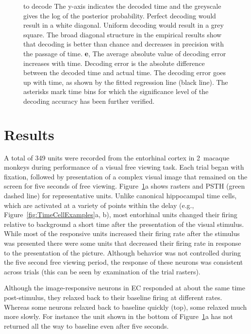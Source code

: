 \documentclass{apa}
\begin{document}
\begin{figure}
{			to decode  The y-axis indicates the decoded time and the greyscale
			gives the log of the posterior probability.  Perfect decoding
			would result in a white diagonal.  Uniform decoding would result
			in a grey square.   The broad diagonal structure in the empirical
			results show that decoding is better than chance and decreases in
			precision with the passage of time.
			\textbf{e}, The average absolute value of decoding error increases
			with time.  Decoding error is the absolute difference between the
			decoded time and actual time.   The decoding error goes up with
			time, as shown by the fitted regression line (black line).  The
			asterisks mark time bins for which the significance level of the
			decoding accuracy has been further verified.  
			\label{fig:SingleCellResults}
	}
\end{figure}


\section{Results}


A total of 349 units were recorded from the entorhinal cortex in 2~macaque
monkeys during performance of a visual free viewing task.  Each trial began
with fixation, followed by presentation of a complex visual image that remained on the
screen for five seconds of free viewing.
Figure~\ref{fig:SingleCellResults}a  shows rasters and PSTH
(green dashed line) for
representative units.  Unlike canonical hippocampal time cells, which are
activated at a variety of points within the delay (e.g.,
Figure~\ref{fig:TimeCellExamples}a, b), most entorhinal units changed their firing
relative to background a short time after the presentation of the visual
stimulus.
While most of the responsive units increased their firing rate after the
stimulus was presented there were some units that decreased their firing rate
in response to the presentation of the picture.  Although behavior was not
controlled during the five second free viewing period, the response of these
neurons was consistent across trials (this can be seen by examination of the
trial rasters).

Although the image-responsive neurons in EC responded at about the same time
post-stimulus, they relaxed back to their baseline firing at different rates.
Whereas some neurons relaxed back to baseline quickly (top), some relaxed much
more slowly.  For instance the unit shown in the bottom of
Figure~\ref{fig:SingleCellResults}a has not returned all the way to baseline
even after five seconds.
\end{document}

